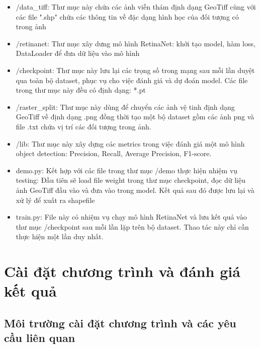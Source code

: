 \documentclass[a4paper, 12pt]{report}
\begin{document}
\begin{itemize}
	\item $/$data\_tiff: Thư mục này chứa các ảnh viễn thám định dạng GeoTiff cùng với các file ".shp" chứa các thông tin về đặc dạng hình học của đối tượng có trong ảnh
	\item $/$retinanet: Thư mục xây dưng mô hình RetinaNet: khởi tạo model,  hàm loss, DataLoader để đưa dữ liệu vào mô hình
	\item $/$checkpoint: Thư mục này lưu lại các trọng số trong mạng sau mỗi lần duyệt qua toàn bộ dataset, phục vụ cho việc đánh giá và dự đoán model. Các file trong thư mục này đều có định dạng: *.pt
	\item /raster\_split: Thư mục này dùng để chuyển các ảnh vệ tinh định dạng GeoTiff về định dạng .png đồng thời tạo một bộ dataset gồm các ảnh png và file .txt chứa vị trí các đối tượng trong ảnh.
	\item /lib: Thư mục này xây dựng các metrics trong việc đánh giá một mô hình object detection: Precision, Recall, Average Precision, F1-score.
	\item demo.py: Kết hợp với các file trong thư mục /demo thực hiện nhiệm vụ testing: Đầu tiên sẽ load file weight trong thư mục checkpoint, đọc dữ liệu ảnh GeoTiff đầu vào và đưa vào trong model. Kết quả sau đó được lưu lại và xử lý để xuất ra shapefile
	\item train.py: File này có nhiệm vụ chạy mô hình RetinaNet và lưu kết quả vào thư mục /checkpoint sau mỗi lần lặp trên bộ dataset. Thao tác này chỉ cần thực hiện một lần duy nhất.
	
	 
	
	
\end{itemize}



\chapter{Cài đặt chương trình và đánh giá kết quả}

\section{Môi trường cài đặt chương trình và các yêu cầu liên quan}
\end{document}
